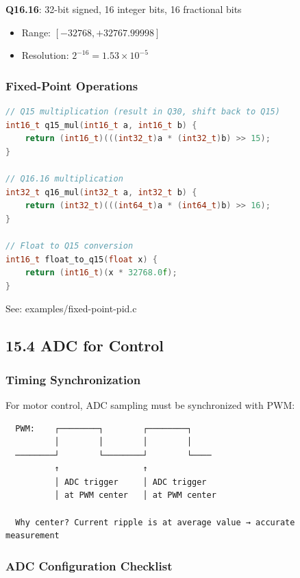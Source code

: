 \documentclass[11pt,a4paper]{book}
\begin{document}
\begin{itemize}
\textbf{Q16.16}: 32-bit signed, 16 integer bits, 16 fractional bits
\begin{itemize}
\item Range: $[-32768, +32767.99998]$
\item Resolution: $2^{-16} = 1.53 \times 10^{-5}$
\end{itemize}

\subsubsection{Fixed-Point Operations}

\begin{lstlisting}[language=c]
// Q15 multiplication (result in Q30, shift back to Q15)
int16_t q15_mul(int16_t a, int16_t b) {
    return (int16_t)(((int32_t)a * (int32_t)b) >> 15);
}

// Q16.16 multiplication
int32_t q16_mul(int32_t a, int32_t b) {
    return (int32_t)(((int64_t)a * (int64_t)b) >> 16);
}

// Float to Q15 conversion
int16_t float_to_q15(float x) {
    return (int16_t)(x * 32768.0f);
}
\end{lstlisting}

See: examples/fixed-point-pid.c

\medskip\noindent\hrulefill\medskip

\subsection{15.4 ADC for Control}

\subsubsection{Timing Synchronization}

For motor control, ADC sampling must be synchronized with PWM:

\begin{lstlisting}
  PWM:    ┌────────┐        ┌────────┐
          │        │        │        │
  ────────┘        └────────┘        └────
          ↑                 ↑
          │ ADC trigger     │ ADC trigger
          │ at PWM center   │ at PWM center
          
  Why center? Current ripple is at average value → accurate measurement
\end{lstlisting}

\subsubsection{ADC Configuration Checklist}


\end{itemize}
\end{document}
